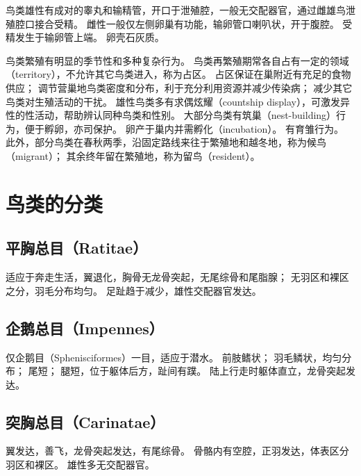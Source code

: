 \documentclass[11pt]{article}
\begin{document}
\newline

鸟类雄性有成对的睾丸和输精管，开口于泄殖腔，一般无交配器官，通过雌雄鸟泄殖腔口接合受精。
雌性一般仅左侧卵巢有功能，输卵管口喇叭状，开于腹腔。
受精发生于输卵管上端。
卵壳石灰质。

\newline

鸟类繁殖有明显的季节性和多种复杂行为。
鸟类再繁殖期常各自占有一定的领域（territory），不允许其它鸟类进入，称为占区。
占区保证在巢附近有充足的食物供应；
调节营巢地鸟类密度和分布，利于充分利用资源并减少传染病；
减少其它鸟类对生殖活动的干扰。
雄性鸟类多有求偶炫耀（countship display），可激发异性的性活动，帮助辨认同种鸟类和性别。
大部分鸟类有筑巢（nest-building）行为，便于孵卵，亦司保护。
卵产于巢内并需孵化（incubation）。
有育雏行为。
此外，部分鸟类在春秋两季，沿固定路线来往于繁殖地和越冬地，称为候鸟（migrant）；
其余终年留在繁殖地，称为留鸟（resident）。

\section{鸟类的分类}
\subsection{平胸总目（Ratitae）}
适应于奔走生活，翼退化，胸骨无龙骨突起，无尾综骨和尾脂腺；
无羽区和裸区之分，羽毛分布均匀。
足趾趋于减少，雄性交配器官发达。

\subsection{企鹅总目（Impennes）}
仅企鹅目（Sphenisciformes）一目，适应于潜水。
前肢鳍状；
羽毛鳞状，均匀分布；
尾短；
腿短，位于躯体后方，趾间有蹼。
陆上行走时躯体直立，龙骨突起发达。

\subsection{突胸总目（Carinatae）}
翼发达，善飞，龙骨突起发达，有尾综骨。
骨骼内有空腔，正羽发达，体表区分羽区和裸区。
雄性多无交配器官。
\end{document}
